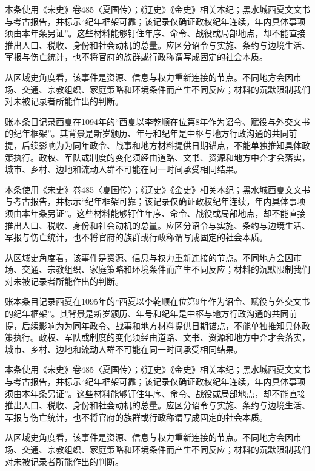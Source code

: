本条使用《宋史》卷485〈夏国传〉；《辽史》《金史》相关本纪；黑水城西夏文文书与考古报告，并标示“纪年框架可靠；该记录仅确证政权纪年连续，年内具体事项须由本年条另证”。这些材料能够钉住年序、命令、战役或局部地点，却不能直接推出人口、税收、身份和社会动机的总量。应区分诏令与实施、条约与边境生活、军报与伤亡统计，也不将官府的族群或行政称谓写成固定的社会本质。

从区域史角度看，该事件是资源、信息与权力重新连接的节点。不同地方会因市场、交通、宗教组织、家庭策略和环境条件而产生不同反应；材料的沉默限制我们对未被记录者所能作出的判断。

账本条目记录西夏在1094年的“西夏以李乾顺在位第8年作为诏令、赋役与外交文书的纪年框架”。其背景是新岁颁历、年号和纪年是中枢与地方行政沟通的共同前提，后续影响为为同年政令、战事和地方材料提供日期锚点，不能单独推知具体政策执行。政权、军队或制度的变化须经由道路、文书、资源和地方中介才会落实，城市、乡村、边地和流动人群不可能在同一时间承受相同结果。

本条使用《宋史》卷485〈夏国传〉；《辽史》《金史》相关本纪；黑水城西夏文文书与考古报告，并标示“纪年框架可靠；该记录仅确证政权纪年连续，年内具体事项须由本年条另证”。这些材料能够钉住年序、命令、战役或局部地点，却不能直接推出人口、税收、身份和社会动机的总量。应区分诏令与实施、条约与边境生活、军报与伤亡统计，也不将官府的族群或行政称谓写成固定的社会本质。

从区域史角度看，该事件是资源、信息与权力重新连接的节点。不同地方会因市场、交通、宗教组织、家庭策略和环境条件而产生不同反应；材料的沉默限制我们对未被记录者所能作出的判断。

账本条目记录西夏在1095年的“西夏以李乾顺在位第9年作为诏令、赋役与外交文书的纪年框架”。其背景是新岁颁历、年号和纪年是中枢与地方行政沟通的共同前提，后续影响为为同年政令、战事和地方材料提供日期锚点，不能单独推知具体政策执行。政权、军队或制度的变化须经由道路、文书、资源和地方中介才会落实，城市、乡村、边地和流动人群不可能在同一时间承受相同结果。

本条使用《宋史》卷485〈夏国传〉；《辽史》《金史》相关本纪；黑水城西夏文文书与考古报告，并标示“纪年框架可靠；该记录仅确证政权纪年连续，年内具体事项须由本年条另证”。这些材料能够钉住年序、命令、战役或局部地点，却不能直接推出人口、税收、身份和社会动机的总量。应区分诏令与实施、条约与边境生活、军报与伤亡统计，也不将官府的族群或行政称谓写成固定的社会本质。

从区域史角度看，该事件是资源、信息与权力重新连接的节点。不同地方会因市场、交通、宗教组织、家庭策略和环境条件而产生不同反应；材料的沉默限制我们对未被记录者所能作出的判断。

